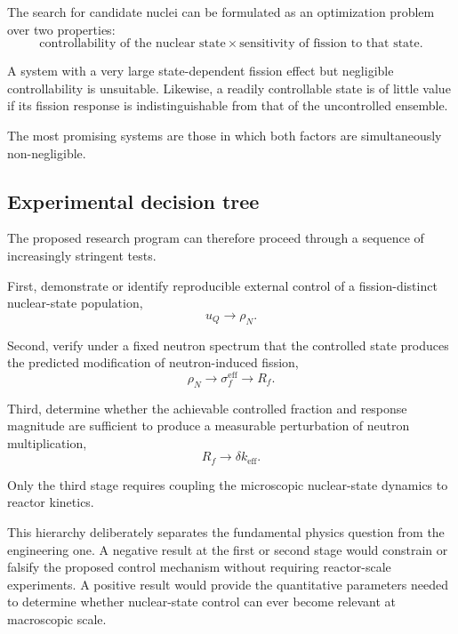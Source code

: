 The search for candidate nuclei can be formulated as an optimization problem over two properties:
\begin{equation}
\boxed{
\text{controllability of the nuclear state}
\times
\text{sensitivity of fission to that state}.
}
\end{equation}

A system with a very large state-dependent fission effect but negligible controllability is unsuitable. Likewise, a readily controllable state is of little value if its fission response is indistinguishable from that of the uncontrolled ensemble.

The most promising systems are those in which both factors are simultaneously non-negligible.

\subsection{Experimental decision tree}

The proposed research program can therefore proceed through a sequence of increasingly stringent tests.

First, demonstrate or identify reproducible external control of a fission-distinct nuclear-state population,
\begin{equation}
u_Q\rightarrow\rho_N.
\end{equation}

Second, verify under a fixed neutron spectrum that the controlled state produces the predicted modification of neutron-induced fission,
\begin{equation}
\rho_N\rightarrow\sigma_f^{\mathrm{eff}}\rightarrow R_f.
\end{equation}

Third, determine whether the achievable controlled fraction and response magnitude are sufficient to produce a measurable perturbation of neutron multiplication,
\begin{equation}
R_f\rightarrow\delta k_{\mathrm{eff}}.
\end{equation}

Only the third stage requires coupling the microscopic nuclear-state dynamics to reactor kinetics.

This hierarchy deliberately separates the fundamental physics question from the engineering one. A negative result at the first or second stage would constrain or falsify the proposed control mechanism without requiring reactor-scale experiments. A positive result would provide the quantitative parameters needed to determine whether nuclear-state control can ever become relevant at macroscopic scale.
